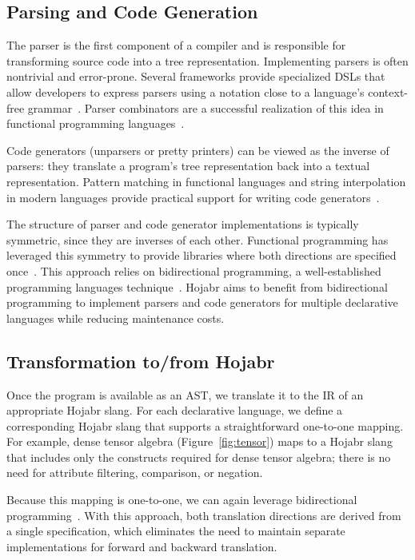 \documentclass[sigconf,nonacm]{acmart}
\begin{document}
\subsection{Parsing and Code Generation}
\label{sec:parserunparser}
The parser is the first component of a compiler and is responsible for transforming source code into a tree representation. Implementing parsers is often nontrivial and error-prone. Several frameworks provide specialized DSLs that allow developers to express parsers using a notation close to a language’s context-free grammar~\cite{cooper2022engineering}. Parser combinators are a successful realization of this idea in functional programming languages~\cite{hutton1992higher}.

Code generators (unparsers or pretty printers) can be viewed as the inverse of parsers: they translate a program’s tree representation back into a textual representation. Pattern matching in functional languages and string interpolation in modern languages provide practical support for writing code generators~\cite{hughes1995design}.

The structure of parser and code generator implementations is typically symmetric, since they are inverses of each other. Functional programming has leveraged this symmetry to provide libraries where both directions are specified once~\cite{rendel2010invertible}. This approach relies on bidirectional programming, a well-established programming languages technique~\cite{foster2009bidirectional}. Hojabr aims to benefit from bidirectional programming to implement parsers and code generators for multiple declarative languages while reducing maintenance costs.

\subsection{Transformation to/from Hojabr}
\label{sec:toslang}
Once the program is available as an AST, we translate it to the IR of an appropriate Hojabr slang. For each declarative language, we define a corresponding Hojabr slang that supports a straightforward one-to-one mapping. For example, dense tensor algebra (Figure~\ref{fig:tensor}) maps to a Hojabr slang that includes only the constructs required for dense tensor algebra; there is no need for attribute filtering, comparison, or negation.

Because this mapping is one-to-one, we can again leverage bidirectional programming~\cite{foster2007combinators}. With this approach, both translation directions are derived from a single specification, which eliminates the need to maintain separate implementations for forward and backward translation.
\end{document}
